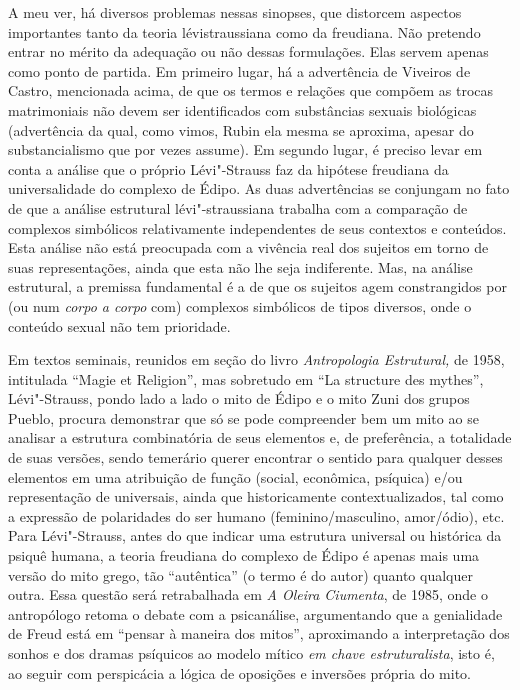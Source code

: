 A meu ver, há diversos problemas nessas sinopses, que distorcem aspectos
importantes tanto da teoria lévistraussiana como da freudiana. Não
pretendo entrar no mérito da adequação ou não dessas formulações. Elas
servem apenas como ponto de partida. Em primeiro lugar, há a advertência
de Viveiros de Castro, mencionada acima, de que os termos e relações que
compõem as trocas matrimoniais não devem ser identificados com
substâncias sexuais biológicas (advertência da qual, como vimos, Rubin
ela mesma se aproxima, apesar do substancialismo que por vezes assume).
Em segundo lugar, é preciso levar em conta a análise que o próprio
Lévi"-Strauss faz da hipótese freudiana da universalidade do complexo de
Édipo. As duas advertências se conjungam no fato de que a análise
estrutural lévi"-straussiana trabalha com a comparação de complexos
simbólicos relativamente independentes de seus contextos e conteúdos.
Esta análise não está preocupada com a vivência real dos sujeitos em
torno de suas representações, ainda que esta não lhe seja indiferente.
Mas, na análise estrutural, a premissa fundamental é a de que os
sujeitos agem constrangidos por (ou num \emph{corpo a corpo} com)
complexos simbólicos de tipos diversos, onde o conteúdo sexual não tem
prioridade.

Em textos seminais, reunidos em seção do livro \emph{Antropologia
Estrutural,} de 1958, intitulada ``Magie et Religion'', mas sobretudo em
``La structure des mythes'', Lévi"-Strauss, pondo lado a lado o mito de
Édipo e o mito Zuni dos grupos Pueblo, procura demonstrar que só se pode
compreender bem um mito ao se analisar a estrutura combinatória de seus
elementos e, de preferência, a totalidade de suas versões, sendo
temerário querer encontrar o sentido para qualquer desses elementos em
uma atribuição de função (social, econômica, psíquica) e/ou
representação de universais, ainda que historicamente contextualizados,
tal como a expressão de polaridades do ser humano (feminino/masculino,
amor/ódio), etc. Para Lévi"-Strauss, antes do que indicar uma estrutura
universal ou histórica da psiquê humana, a teoria freudiana do complexo
de Édipo é apenas mais uma versão do mito grego, tão ``autêntica'' (o
termo é do autor) quanto qualquer outra. Essa questão será retrabalhada
em \emph{A Oleira Ciumenta}, de 1985, onde o antropólogo retoma o debate
com a psicanálise, argumentando que a genialidade de Freud está em
``pensar à maneira dos mitos'', aproximando a interpretação dos sonhos e
dos dramas psíquicos ao modelo mítico \emph{em chave estruturalista},
isto é, ao seguir com perspicácia a lógica de oposições e inversões
própria do mito.

